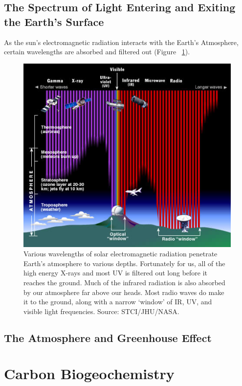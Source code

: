 \documentclass{book}\usepackage{knitr}
\begin{document}
\begin{knitrout}
\begin{kframe}
\subsection{The Spectrum of Light Entering and Exiting the Earth's Surface}

As the sun's electromagnetic radiation interacts with the Earth's Atmosphere, certain wavelengths are absorbed and filtered out (Figure~ \ref{fig:em-entering}).

\begin{figure}
\includegraphics[width=\linewidth]{images/earth-system/em-radiation-atmosph-depth-stsci.jpg}
\caption{Various wavelengths of solar electromagnetic radiation penetrate Earth's atmosphere to various depths. Fortunately for us, all of the high energy X-rays and most UV is filtered out long before it reaches the ground. Much of the infrared radiation is also absorbed by our atmosphere far above our heads. Most radio waves do make it to the ground, along with a narrow `window' of IR, UV, and visible light frequencies. Source: STCI/JHU/NASA.}
\label{fig:em-entering}
\end{figure}

\subsection{The Atmosphere and Greenhouse Effect}



\section{Carbon Biogeochemistry}


\end{kframe}
\end{knitrout}
\end{document}
